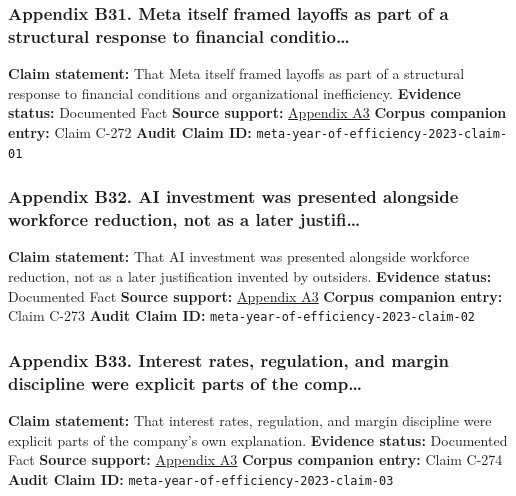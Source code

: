 \documentclass[
  american,
  11pt,
  letterpaper,
]{article}
\begin{document}
\subsubsection{Appendix B31. Meta itself framed layoffs as part of a
structural response to financial
conditio\ldots{}}\label{appendix-b31-meta-itself-framed-layoffs-as-part-of-a-structural-response-to-financial-conditio}

\textbf{Claim statement:} That Meta itself framed layoffs as part of a
structural response to financial conditions and organizational
inefficiency. \textbf{Evidence status:} Documented Fact \textbf{Source
support:}
\hyperref[appendix-a3-mark-zuckerberg-s-message-to-meta-employees]{Appendix
A3} \textbf{Corpus companion entry:} Claim C-272 \textbf{Audit Claim
ID:} \texttt{meta-year-of-efficiency-2023-claim-01}

\subsubsection{Appendix B32. AI investment was presented alongside
workforce reduction, not as a later
justifi\ldots{}}\label{appendix-b32-ai-investment-was-presented-alongside-workforce-reduction-not-as-a-later-justifi}

\textbf{Claim statement:} That AI investment was presented alongside
workforce reduction, not as a later justification invented by outsiders.
\textbf{Evidence status:} Documented Fact \textbf{Source support:}
\hyperref[appendix-a3-mark-zuckerberg-s-message-to-meta-employees]{Appendix
A3} \textbf{Corpus companion entry:} Claim C-273 \textbf{Audit Claim
ID:} \texttt{meta-year-of-efficiency-2023-claim-02}

\subsubsection{Appendix B33. Interest rates, regulation, and margin
discipline were explicit parts of the
comp\ldots{}}\label{appendix-b33-interest-rates-regulation-and-margin-discipline-were-explicit-parts-of-the-comp}

\textbf{Claim statement:} That interest rates, regulation, and margin
discipline were explicit parts of the company's own explanation.
\textbf{Evidence status:} Documented Fact \textbf{Source support:}
\hyperref[appendix-a3-mark-zuckerberg-s-message-to-meta-employees]{Appendix
A3} \textbf{Corpus companion entry:} Claim C-274 \textbf{Audit Claim
ID:} \texttt{meta-year-of-efficiency-2023-claim-03}
\end{document}
